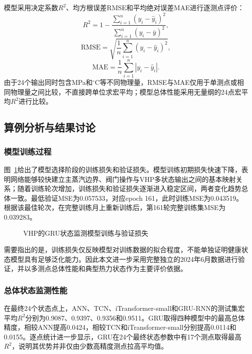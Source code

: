 模型采用决定系数$R^2$、均方根误差RMSE和平均绝对误差MAE进行逐测点评价：
\begin{equation}
R^2=1-\frac{\sum_{i=1}^{n}(y_i-\hat y_i)^2}{\sum_{i=1}^{n}(y_i-\bar y)^2},
\end{equation}
\begin{equation}
\mathrm{RMSE}=\sqrt{\frac{1}{n}\sum_{i=1}^{n}(y_i-\hat y_i)^2},
\end{equation}
\begin{equation}
\mathrm{MAE}=\frac{1}{n}\sum_{i=1}^{n}|y_i-\hat y_i|.
\end{equation}
由于24个输出同时包含MPa和$^{\circ}$C等不同物理量，RMSE与MAE仅用于单测点或相同物理量之间比较，不直接跨单位求宏平均；模型总体性能采用无量纲的24点宏平均$R^2$进行比较。

\subsection{算例分析与结果讨论}
\label{subsec:gru_results_v2}

\subsubsection{模型训练过程}

图~\ref{fig:gru_loss_v2}给出了模型选择阶段的训练损失和验证损失。模型训练初期损失快速下降，表明网络能够较快建立主蒸汽边界、阀门操作与VHP多状态输出之间的基本映射关系；随着训练轮次增加，训练损失和验证损失逐渐进入稳定区间，两者变化趋势总体一致。最低验证MSE为0.057533，对应epoch 161，此时训练MSE为0.043519。根据该最佳轮次，在完整训练月上重新训练后，第161轮完整训练集MSE为0.039283。

\begin{figure}[htbp]
    \centering
    \caption{VHP的GRU状态监测模型训练与验证损失}
    \label{fig:gru_loss_v2}
\end{figure}

需要指出的是，训练损失仅反映模型对训练数据的拟合程度，不能单独证明健康状态模型具有足够泛化能力。因此本文进一步采用完整独立的2024年6月数据进行验证，并以多测点总体性能和典型热力状态作为主要评价依据。

\subsubsection{总体状态监测性能}

在最终24个状态点上，ANN、TCN、iTransformer-small和GRU-RNN的测试集宏平均$R^2$分别为0.9087、0.9397、0.9356和0.9511。GRU取得四种模型中的最高总体精度，相较ANN提高0.0424，相较TCN和iTransformer-small分别提高0.0114和0.0155。逐点统计进一步显示，GRU在24个最终状态参数中有17个测点取得最高$R^2$，说明其优势并非仅由少数高精度测点拉高平均值。

